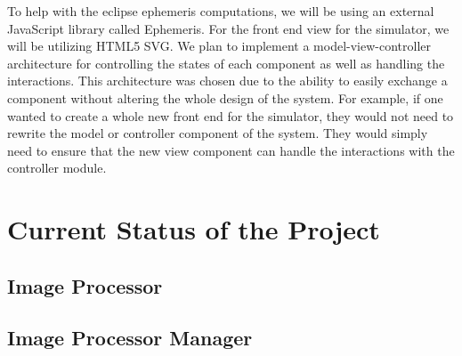 \documentclass[10pt, onecolumn, draftclsnofoot, letterpaper, compsoc]{IEEEtran}
\begin{document}
To help with the eclipse ephemeris computations, we will be using an external
JavaScript library called Ephemeris. For the front end view for the simulator,
we will be utilizing HTML5 SVG. We plan to implement a model-view-controller
architecture for controlling the states of each component as well as handling
the interactions. This architecture was chosen due to the ability to easily
exchange a component without altering the whole design of the system. For
example, if one wanted to create a whole new front end for the simulator,
they would not need to rewrite the model or controller component of the system.
They would simply need to ensure that the new view component can handle the
interactions with the controller module.


\section{Current Status of the Project}


\subsection{Image Processor}



\subsection{Image Processor Manager}
\end{document}
